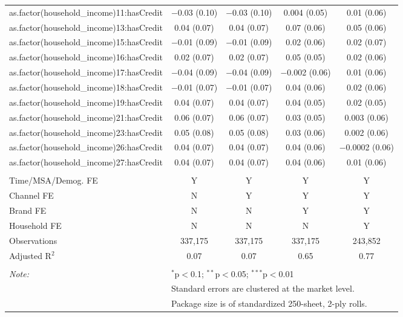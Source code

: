\begin{table}[!htbp]
\begin{tabular}{@{\extracolsep{5pt}}lcccc}
  as.factor(household\_income)11:hasCredit & $-$0.03 (0.10) & $-$0.03 (0.10) & 0.004 (0.05) & 0.01 (0.06) \\ 
  as.factor(household\_income)13:hasCredit & 0.04 (0.07) & 0.04 (0.07) & 0.07 (0.06) & 0.05 (0.06) \\ 
  as.factor(household\_income)15:hasCredit & $-$0.01 (0.09) & $-$0.01 (0.09) & 0.02 (0.06) & 0.02 (0.07) \\ 
  as.factor(household\_income)16:hasCredit & 0.02 (0.07) & 0.02 (0.07) & 0.05 (0.05) & 0.02 (0.06) \\ 
  as.factor(household\_income)17:hasCredit & $-$0.04 (0.09) & $-$0.04 (0.09) & $-$0.002 (0.06) & 0.01 (0.06) \\ 
  as.factor(household\_income)18:hasCredit & $-$0.01 (0.07) & $-$0.01 (0.07) & 0.04 (0.06) & 0.02 (0.06) \\ 
  as.factor(household\_income)19:hasCredit & 0.04 (0.07) & 0.04 (0.07) & 0.04 (0.05) & 0.02 (0.05) \\ 
  as.factor(household\_income)21:hasCredit & 0.06 (0.07) & 0.06 (0.07) & 0.03 (0.05) & 0.003 (0.06) \\ 
  as.factor(household\_income)23:hasCredit & 0.05 (0.08) & 0.05 (0.08) & 0.03 (0.06) & 0.002 (0.06) \\ 
  as.factor(household\_income)26:hasCredit & 0.04 (0.07) & 0.04 (0.07) & 0.04 (0.06) & $-$0.0002 (0.06) \\ 
  as.factor(household\_income)27:hasCredit & 0.04 (0.07) & 0.04 (0.07) & 0.04 (0.06) & 0.01 (0.06) \\ 
 \hline \\[-1.8ex] 
Time/MSA/Demog. FE & Y & Y & Y & Y \\ 
Channel FE & N & Y & Y & Y \\ 
Brand FE & N & N & Y & Y \\ 
Household FE & N & N & N & Y \\ 
Observations & 337,175 & 337,175 & 337,175 & 243,852 \\ 
Adjusted R$^{2}$ & 0.07 & 0.07 & 0.65 & 0.77 \\ 
\hline 
\hline \\[-1.8ex] 
\textit{Note:}  & \multicolumn{4}{l}{$^{*}$p$<$0.1; $^{**}$p$<$0.05; $^{***}$p$<$0.01} \\ 
 & \multicolumn{4}{l}{Standard errors are clustered at the market level.} \\ 
 & \multicolumn{4}{l}{Package size is of standardized 250-sheet, 2-ply rolls.} \\ 
\end{tabular} 
\end{table} 
